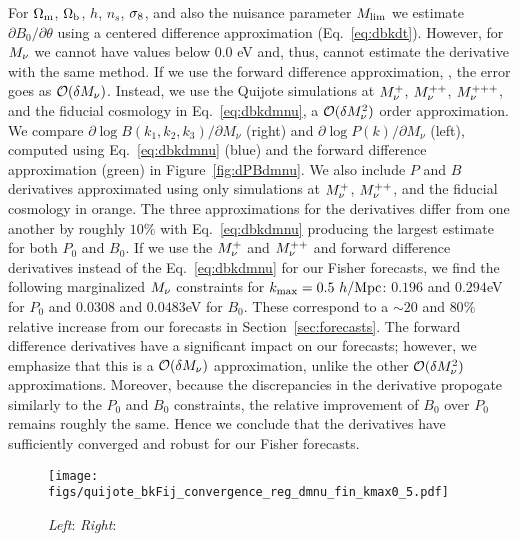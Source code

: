 For $\Omega_{\rm m}$, $\Omega_{\rm b}$, $h$, $n_s$, $\sigma_8$, and also the nuisance parameter $M_{\rm lim}$ 
we estimate $\partial B_0/\partial \theta$ using a centered difference approximation 
(Eq.~\ref{eq:dbkdt}). However, for $M_\nu$ we cannot have values below 0.0 eV 
and, thus, cannot estimate the derivative with the same method. If we use the 
forward difference approximation, 
\beq 
{} \approx {}, 
\eeq
the error goes as $\mathcal{O}(\delta M_\nu)$. Instead, we use the Quijote 
simulations at $M_\nu^{+}$, $M_\nu^{++}$, $M_\nu^{+++}$, and the fiducial 
cosmology in Eq.~\ref{eq:dbkdmnu}, a $\mathcal{O}(\delta M_\nu^2)$ order 
approximation. 
We compare 
$\partial \log B(k_1, k_2, k_3)/\partial M_\nu$ (right) and 
$\partial \log P(k)/\partial M_\nu$ (left), computed using Eq.~\ref{eq:dbkdmnu} (blue) 
and the forward difference approximation (green) in Figure~\ref{fig:dPBdmnu}.
We also include $P$ and $B$ derivatives approximated using only simulations at $M_\nu^{+}$,  
$M_\nu^{++}$, and the fiducial cosmology in orange. The three approximations for the 
derivatives differ from one another by roughly $10\%$ with Eq.~\ref{eq:dbkdmnu} producing 
the largest estimate for both $P_0$ and $B_0$. If we use the $M_\nu^{+}$ and $M_\nu^{++}$ 
and forward difference derivatives instead of the Eq.~\ref{eq:dbkdmnu} for our Fisher 
forecasts, we find the following marginalized $M_\nu$ constraints for $k_{\rm max} = 0.5~h/{\rm Mpc}$: 
$0.196$ and $0.294$eV for $P_0$ and  $0.0308$ and $0.0483$eV for $B_0$. These correspond 
to a $\sim20$ and $80\%$ relative increase from our forecasts in Section~\ref{sec:forecasts}. 
The forward difference derivatives have a significant impact on our forecasts; however, 
we emphasize that this is a 
$\mathcal{O}(\delta M_\nu)$ approximation, unlike the other $\mathcal{O}(\delta M_\nu^2)$ 
approximations. Moreover, because the discrepancies in the derivative propogate similarly
to the $P_0$ and $B_0$ constraints, the relative improvement of $B_0$ over $P_0$ remains
roughly the same. Hence we conclude that the derivatives have sufficiently converged and 
robust for our Fisher forecasts.

\begin{figure}
\begin{center}
    \texttt{[image: figs/quijote\_bkFij\_convergence\_reg\_dmnu\_fin\_kmax0\_5.pdf]}
    \caption{{\em Left}: {\em Right}:}
\label{fig:fij_converge}
\end{center}
\end{figure}

